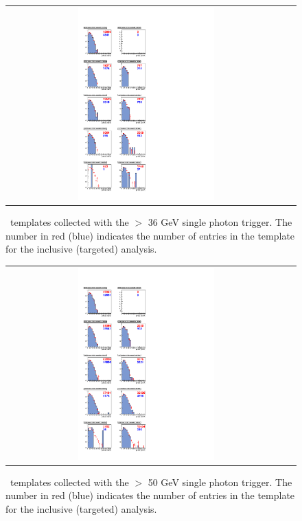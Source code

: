 \begin{figure}[!h]
\begin{center}
\begin{tabular}{cc}
\includegraphics[width=0.5\textwidth]{plots/template_targeted_1_19p5fb.pdf}
\end{tabular}
\caption{
\MET\ templates collected with the \pt $>$ 36 GeV single photon trigger.
The number in red (blue) indicates the number of entries in the template for the inclusive (targeted) analysis.
}
\end{center}
\end{figure}

\clearpage

\begin{figure}[!h]
\begin{center}
\begin{tabular}{cc}
\includegraphics[width=0.5\textwidth]{plots/template_targeted_2_19p5fb.pdf}
\end{tabular}
\caption{
\MET\ templates collected with the \pt $>$ 50 GeV single photon trigger.
The number in red (blue) indicates the number of entries in the template for the inclusive (targeted) analysis.
}
\end{center}
\end{figure}

